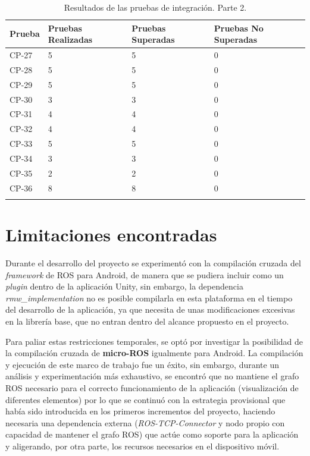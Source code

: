 \begin{longtable}{|p{2cm}|p{4cm}|p{4cm}|p{4cm}|}
\hline
\textbf{Prueba} & \textbf{Pruebas Realizadas} & \textbf{Pruebas Superadas} & \textbf{Pruebas No Superadas} \\
\hline
CP-27 & 5 & 5 & 0 \\
\hline
CP-28 & 5 & 5 & 0 \\
\hline
CP-29 & 5 & 5 & 0 \\
\hline
CP-30 & 3 & 3 & 0 \\
\hline
CP-31 & 4 & 4 & 0 \\
\hline
CP-32 & 4 & 4 & 0 \\
\hline
CP-33 & 5 & 5 & 0 \\
\hline
CP-34 & 3 & 3 & 0 \\
\hline
CP-35 & 2 & 2 & 0 \\
\hline
CP-36 & 8 & 8 & 0 \\
\hline
\caption{Resultados de las pruebas de integración. Parte 2.}
\end{longtable}

\section{Limitaciones encontradas}
Durante el desarrollo del proyecto se experimentó con la compilación cruzada del \textit{framework} de ROS para Android, 
de manera que se pudiera incluir como un \textit{plugin} dentro de la aplicación Unity, sin embargo, la dependencia
\textit{rmw\_implementation} no es posible compilarla en esta plataforma en el tiempo del desarrollo de la aplicación,
ya que necesita de unas modificaciones excesivas en la librería base, que no entran dentro del alcance propuesto en el proyecto.

Para paliar estas restricciones temporales, se optó por investigar la posibilidad de la compilación cruzada de \textbf{micro-ROS}
igualmente para Android. La compilación y ejecución de este marco de trabajo fue un éxito, sin embargo, durante un análisis 
y experimentación más exhaustivo, se encontró que no mantiene el grafo ROS necesario para el correcto funcionamiento de la aplicación
(visualización de diferentes elementos)
por lo que se continuó con la estrategia provisional que había sido introducida en los primeros incrementos del proyecto, 
haciendo necesaria una dependencia externa (\textit{ROS-TCP-Connector} y nodo propio con capacidad de mantener el grafo ROS) 
que actúe como soporte para la aplicación y aligerando, por otra parte, los recursos necesarios en el dispositivo móvil.

